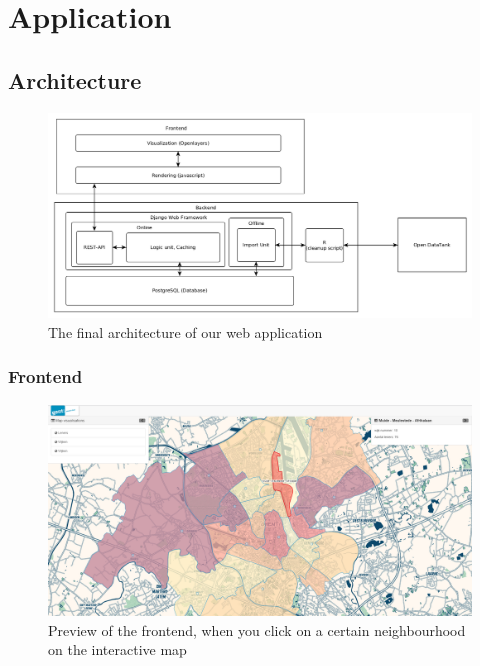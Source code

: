 \chapter{Application}
\section{Architecture}

\begin{figure}[h!]
  \centering
      \includegraphics[width=16cm]{fig/Architecture}
 	 \caption{The final architecture of our web application}
\end{figure}
\subsection{Frontend}


\begin{figure}[h!]
	\centering
	\includegraphics[width=16cm]{fig/frontend}
	\caption{Preview of the frontend, when you click on a certain neighbourhood on the interactive map}
	\label{fig:frontend}
\end{figure}


